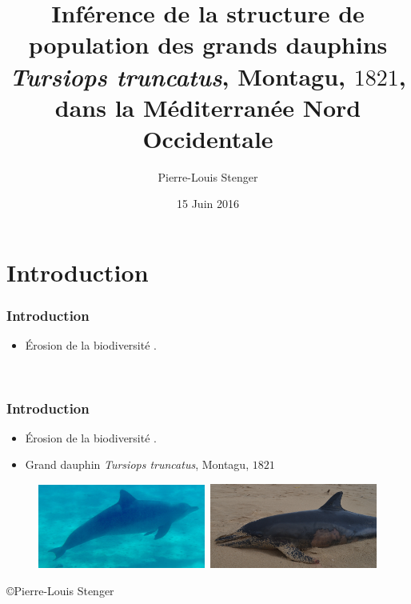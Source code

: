 \documentclass[10pt,xcolor=table]{beamer}\usepackage[]{graphicx}\usepackage[]{color}
\title{Inférence de la structure de population des grands dauphins \emph{Tursiops truncatus}, Montagu, $1821$, dans la Méditerranée Nord Occidentale}
\author{Pierre-Louis Stenger}
\institute{Université de la Rochelle}
\date{15 Juin 2016}
\begin{document}
	

\frame{\titlepage}

\section{Introduction}

\begin{frame}
	\frametitle{Introduction}
	\begin{itemize}
		\item Érosion de la biodiversité \citep{pimm2014aa}.
	\end{itemize}
	\\[5.1cm]
\end{frame}

\begin{frame}
	\frametitle{Introduction}
	\begin{itemize}
		\item Érosion de la biodiversité \citep{pimm2014aa}.
		\item Grand dauphin \emph{Tursiops truncatus}, Montagu, $1821$ \citep{schipper2008status}
	\end{itemize}
		 \begin{figure}
			\begin{center}
			\includegraphics[width=5.5cm]{tt2}\hspace*{0.5cm}~\includegraphics[width=5.5cm]{tt}
			\end{center}
		\end{figure}
	\centering \tiny \copyright Pierre-Louis Stenger
\end{frame}
\end{document}

